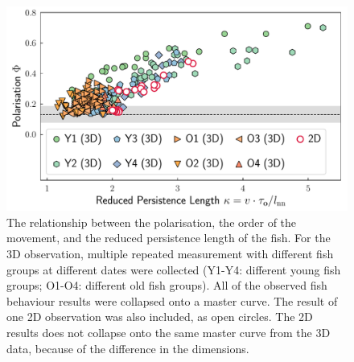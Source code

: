 \documentclass[11pt,twoside]{report}
\begin{document}
 \begin{figure}
  \includegraphics[width=\linewidth,outer]{states-1d}
  \caption[The behaviour of 50 zebrafish described by reduced persistence length]{
  	The relationship between the polarisation, the order of the movement, and the reduced persistence length of the fish. For the 3D observation, multiple repeated measurement with different fish groups at different dates were collected (Y1-Y4: different young fish groups; O1-O4: different old fish groups).
  	All of the observed fish behaviour results were collapsed onto a master curve. The result of one 2D observation was also included, as open circles. The 2D results does not collapse onto the same master curve from the 3D data, because of the difference in the dimensions.
  }
  \label{fig:states-1d}
\end{figure}

\vfill
\pagebreak
\end{document}

